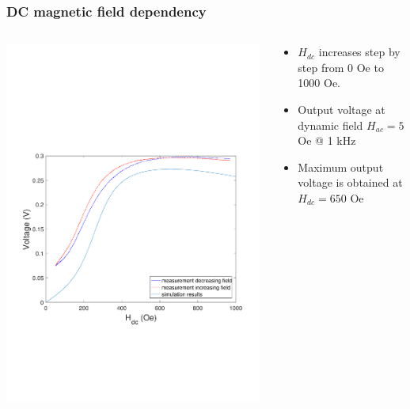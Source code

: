 \documentclass[compress]{beamer}
\begin{document}
\begin{frame}\frametitle{DC magnetic field dependency}
\begin{columns}[totalwidth=\textwidth]
 \begin{column}{.69\textwidth}
 \includegraphics[width=0.99\textwidth]{Graphic/03_volta_bias_recta.pdf}
 \end{column}
 \begin{column}{.29\textwidth}
 \begin{itemize}[label=$\bullet$, font=\small, leftmargin=*]
 \item $H_{dc}$ increases step by step from 0 Oe to 1000 Oe.
 \item Output voltage at dynamic field $H_{ac} = 5$ Oe @ 1 kHz
 \item Maximum output voltage is obtained at $H_{dc} = 650$ Oe
 \end{itemize}
 \end{column}
\end{columns}
\end{frame}
\end{document}
